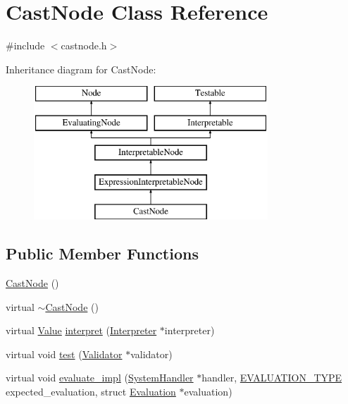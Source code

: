 \hypertarget{classCastNode}{}\section{Cast\+Node Class Reference}
\label{classCastNode}


{\ttfamily \#include $<$castnode.\+h$>$}

Inheritance diagram for Cast\+Node\+:\begin{figure}[H]
\begin{center}
\leavevmode
\includegraphics[height=5.000000cm]{classCastNode}
\end{center}
\end{figure}
\subsection*{Public Member Functions}
\begin{DoxyCompactItemize}
\item 
\hyperlink{classCastNode_aacc7aea8e67a26de47f9a9a175cad3e2}{Cast\+Node} ()
\item 
virtual \hyperlink{classCastNode_a358bc9d180542920fced2b7f35ef3f9f}{$\sim$\+Cast\+Node} ()
\item 
virtual \hyperlink{classValue}{Value} \hyperlink{classCastNode_a2a909a7531791bcbc53c514a01ce5024}{interpret} (\hyperlink{classInterpreter}{Interpreter} $\ast$interpreter)
\item 
virtual void \hyperlink{classCastNode_a19fa03c324a6dcbadac32965a86afb3e}{test} (\hyperlink{classValidator}{Validator} $\ast$validator)
\item 
virtual void \hyperlink{classCastNode_ae0c32d5d076c2572fa7afc9cb1a76a79}{evaluate\+\_\+impl} (\hyperlink{classSystemHandler}{System\+Handler} $\ast$handler, \hyperlink{statics_8h_a6664c451ca7787483a7981cc1de68dbb}{E\+V\+A\+L\+U\+A\+T\+I\+O\+N\+\_\+\+T\+Y\+PE} expected\+\_\+evaluation, struct \hyperlink{structEvaluation}{Evaluation} $\ast$evaluation)
\end{DoxyCompactItemize}
